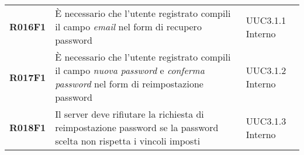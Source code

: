 \documentclass[../analisi-dei-requisiti.tex]{subfiles}
\begin{document}
\begin{center}
\begin{longtable}[H]{>{\centering\bfseries}m{3cm} >{\centering}m{10cm} >{\centering\arraybackslash}m{3cm}}
  R016F1                               & È necessario che l'utente registrato compili il campo \textit{email} nel form di recupero password                                                                                                      & UUC3.1.1 Interno              \\
  R017F1                               & È necessario che l'utente registrato compili il campo \textit{nuova password} e \textit{conferma password} nel form di reimpostazione password                                                          & UUC3.1.2 Interno              \\
  R018F1                               & Il server deve rifiutare la richiesta di reimpostazione password se la password scelta non rispetta i vincoli imposti                                                                                   & UUC3.1.3 Interno              \\


\end{longtable}
\end{center}
\end{document}
